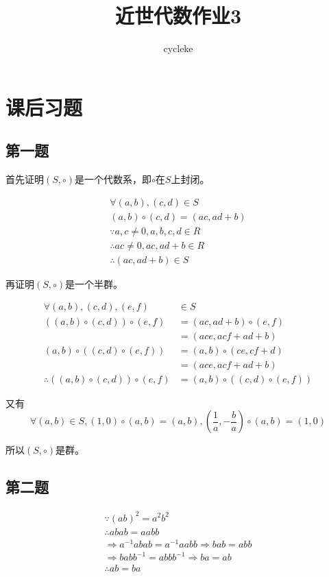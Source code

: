 \documentclass[12pt,onecolumn]{article}
\title{近世代数作业3}
\author{cycleke}
\theoremstyle{plain}
\begin{document}
\maketitle
\tableofcontents
\clearpage

\section{课后习题}

\subsection{第一题}
\begin{proof*}
  首先证明$(S, \circ)$是一个代数系，即$\circ$在$S$上封闭。

  \begin{gather*}
    \forall (a,b), (c, d) \in S \\
    (a, b) \circ (c, d) = (ac, ad + b) \\
    \because a, c \neq 0 , a, b, c, d \in R \\
    \therefore ac \neq 0, ac, ad + b \in R \\
    \therefore (ac, ad + b) \in S
  \end{gather*}

  再证明$(S, \circ)$是一个半群。

  \begin{align*}
    \forall (a, b), (c, d), (e, f) &\in S \\
    ((a, b) \circ (c, d)) \circ (e, f) &= (ac, ad + b) \circ (e, f) \\
                             &= (ace, acf + ad + b) \\
    (a, b) \circ ((c, d) \circ (e, f)) &= (a, b) \circ (ce, cf + d) \\
                             &= (ace, acf + ad + b) \\
    \therefore ((a, b) \circ (c, d)) \circ (e, f) &= (a, b) \circ ((c, d) \circ (e, f))
  \end{align*}

  又有
  \[
    \forall (a, b) \in S,
    (1, 0) \circ (a, b) = (a, b),
    (\frac{1}{a}, -\frac{b}{a}) \circ (a, b) = (1, 0)
  \]

  所以$(S, \circ)$是群。
\end{proof*}

\subsection{第二题}
\begin{proof*}
  \begin{gather*}
    \because {(ab)}^2 = a^2b^2 \\
    \therefore abab = aabb \\
    \Rightarrow a^{-1}abab = a^{-1}aabb
    \Rightarrow bab = abb \\
    \Rightarrow babb^{-1} = abbb^{-1}
    \Rightarrow ba = ab \\
    \therefore ab = ba
  \end{gather*}
\end{proof*}
\end{document}

